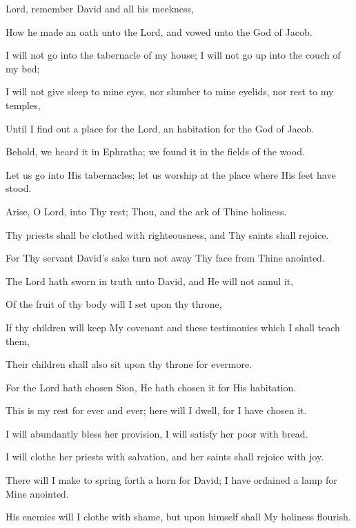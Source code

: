 Lord, remember David and all his meekness,

How he made an oath unto the Lord, and vowed unto the God of Jacob.

I will not go into the tabernacle of my house; I will not go up into the couch of my bed;

I will not give sleep to mine eyes, nor slumber to mine eyelids, nor rest to my temples,

Until I find out a place for the Lord, an habitation for the God of Jacob.

Behold, we heard it in Ephratha; we found it in the fields of the wood.

Let us go into His tabernacles; let us worship at the place where His feet have stood.

Arise, O Lord, into Thy rest; Thou, and the ark of Thine holiness.

Thy priests shall be clothed with righteousness, and Thy saints shall rejoice.

For Thy servant David's sake turn not away Thy face from Thine anointed.

The Lord hath sworn in truth unto David, and He will not annul it,

Of the fruit of thy body will I set upon thy throne,

If thy children will keep My covenant and these testimonies which I shall teach them,

Their children shall also sit upon thy throne for evermore.

For the Lord hath chosen Sion, He hath chosen it for His habitation.

This is my rest for ever and ever; here will I dwell, for I have chosen it.

I will abundantly bless her provision, I will satisfy her poor with bread.

I will clothe her priests with salvation, and her saints shall rejoice with joy.

There will I make to spring forth a horn for David; I have ordained a lamp for Mine anointed.

His enemies will I clothe with shame, but upon himself shall My holiness flourish.
